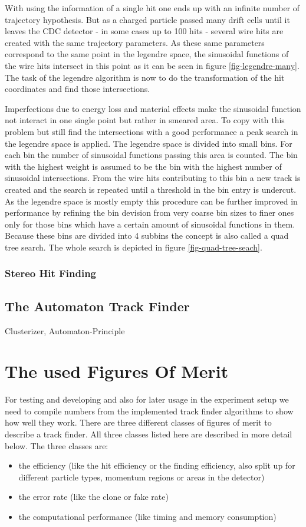 With using the information of a single hit one ends up with an infinite number of trajectory hypothesis. But as a charged particle passed many drift cells until it leaves the CDC detector - in some cases up to 100 hits - several wire hits are created with the same trajectory parameters. As these same parameters correspond to the same point in the legendre space, the sinusoidal functions of the wire hits intersect in this point as it can be seen in figure \ref{fig-legendre-many}. The task of the legendre algorithm is now to do the transformation of the hit coordinates and find those intersections.

Imperfections due to energy loss and material effects make the sinusoidal function not interact in one single point but rather in smeared area. To copy with this problem but still find the intersections with a good performance a peak search in the legendre space is applied. The legendre space is divided into small bins. For each bin the number of sinusoidal functions passing this area is counted. The bin with the highest weight is assumed to be the bin with the highest number of sinusoidal intersections. From the wire hits contributing to this bin a new track is created and the search is repeated until a threshold in the bin entry is undercut. As the legendre space is mostly empty this procedure can be further improved in performance by refining the bin devision from very coarse bin sizes to finer ones only for those bins which have a certain amount of sinusoidal functions in them. Because these bins are divided into 4 subbins the concept is also called a quad tree search. The whole search is depicted in figure \ref{fig-quad-tree-seach}.

\subsubsection{Stereo Hit Finding}


\subsection{The Automaton Track Finder}
Clusterizer, Automaton-Principle


\section{The used Figures Of Merit}

For testing and developing and also for later usage in the experiment setup we need to compile numbers from the implemented track finder algorithms to show how well they work. There are three different classes of figures of merit to describe a track finder. All three classes listed here are described in more detail below. The three classes are:
\begin{itemize}
  \item the efficiency (like the hit efficiency or the finding efficiency, also split up for different particle types, momentum regions or areas in the detector)
  \item the error rate (like the clone or fake rate)
  \item the computational performance (like timing and memory consumption)
\end{itemize}


